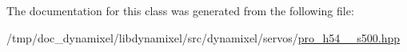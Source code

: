 The documentation for this class was generated from the following file\+:\begin{DoxyCompactItemize}
\item 
/tmp/doc\+\_\+dynamixel/libdynamixel/src/dynamixel/servos/\hyperlink{pro__h54__200__s500_8hpp}{pro\+\_\+h54\+\_\+\_\+s500.\+hpp}\end{DoxyCompactItemize}
